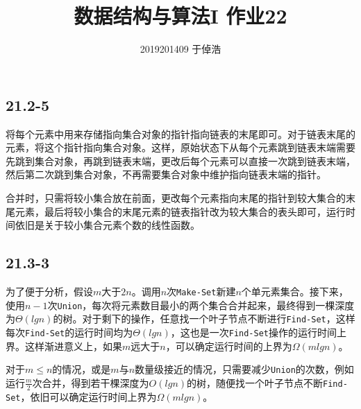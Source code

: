\documentclass[]{article}
\title{数据结构与算法I 作业22}
\author{2019201409 于倬浩}
\begin{document}
\maketitle
\hypertarget{header-n4}{%
\subsection{21.2-5}\label{header-n4}}

将每个元素中用来存储指向集合对象的指针指向链表的末尾即可。对于链表末尾的元素，将这个指针指向集合对象。这样，原始状态下从每个元素跳到链表末端需要先跳到集合对象，再跳到链表末端，更改后每个元素可以直接一次跳到链表末端，然后第二次跳到集合对象，不再需要集合对象中维护指向链表末端的指针。

合并时，只需将较小集合放在前面，更改每个元素指向末尾的指针到较大集合的末尾元素，最后将较小集合的末尾元素的链表指针改为较大集合的表头即可，运行时间依旧是关于较小集合元素个数的线性函数。

\hypertarget{header-n11}{%
\subsection{21.3-3}\label{header-n11}}

为了便于分析，假设\(m\)大于\(2n\)。调用\(n\)次\texttt{Make-Set}新建\(n\)个单元素集合。接下来，使用\(n - 1\)次\texttt{Union}，每次将元素数目最小的两个集合合并起来，最终得到一棵深度为\(\Theta(lgn)\)的树。对于剩下的操作，任意找一个叶子节点不断进行\texttt{Find-Set}，这样每次\texttt{Find-Set}的运行时间均为\(\Theta(lgn)\)，这也是一次\texttt{Find-Set}操作的运行时间上界。这样渐进意义上，如果\(m\)远大于\(n\)，可以确定运行时间的上界为\(\Omega(mlgn)\)。

对于\(m \leq n\)的情况，或是\(m\)与\(n\)数量级接近的情况，只需要减少\texttt{Union}的次数，例如运行\(\frac{m}{2}\)次合并，得到若干棵深度为\(O(lgn)\)的树，随便找一个叶子节点不断\texttt{Find-Set}，依旧可以确定运行时间上界为\(\Omega(mlgn)\)。
\end{document}
